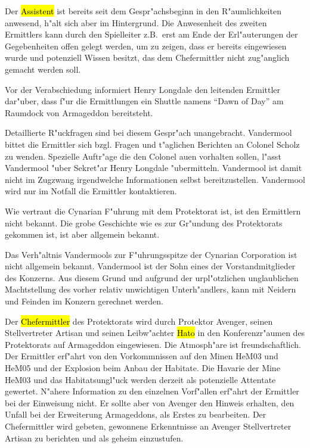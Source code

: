Der \hl{Assistent} ist bereits seit dem Gespr"achsbeginn in den R"aumlichkeiten anwesend, h"alt sich aber im Hintergrund. Die Anwesenheit des zweiten Ermittlers kann durch den Spielleiter z.B.~erst am Ende der Erl"auterungen der Gegebenheiten offen gelegt werden, um zu zeigen, dass er bereits eingewiesen wurde und potenziell Wissen besitzt, das dem Chefermittler nicht zug"anglich gemacht werden soll.

Vor der Verabschiedung informiert Henry Longdale den leitenden Ermittler dar"uber, dass f"ur die Ermittlungen ein Shuttle namens "`Dawn of Day"' am Raumdock von Armageddon bereitsteht.


\begin{remarks}	
	Detaillierte R"uckfragen sind bei diesem Gespr"ach unangebracht. Vandermool bittet die Ermittler sich bzgl. Fragen und t"aglichen Berichten an Colonel Scholz zu wenden. Spezielle Auftr"age die den Colonel au\3en vorhalten sollen, l"asst Vandermool "uber Sekret"ar Henry Longdale "ubermitteln. Vandermool ist damit nicht im Zugzwang irgendwelche Informationen selbst bereitzustellen. Vandermool wird nur im Notfall die Ermittler kontaktieren.

	Wie vertraut die Cynarian F"uhrung mit dem Protektorat ist, ist den Ermittlern nicht bekannt. Die grobe Geschichte wie es zur Gr"undung des Protektorats gekommen ist, ist aber allgemein bekannt.

	Das Verh"altnis Vandermools zur F"uhrungsspitze der Cynarian Corporation ist nicht allgemein bekannt. Vandermool ist der Sohn eines der Vorstandmitglieder des Konzerns. Aus diesem Grund und aufgrund der urpl"otzlichen unglaublichen Machtstellung des vorher relativ unwichtigen Unterh"andlers, kann mit Neidern und Feinden im Konzern gerechnet werden.
\end{remarks}



Der \hl{Chefermittler} des Protektorats wird durch Protektor Avenger, seinen Stellvertreter Artisan und seinen Leibw"achter \hl{Hato} in den Konferenzr"aumen des Protektorats auf Armageddon eingewiesen. Die Atmosph"are ist freundschaftlich. Der Ermittler erf"ahrt von den Vorkommnissen auf den Minen HeM03 und HeM05 und der Explosion beim Anbau der Habitate. Die Havarie der Mine HeM03 und das Habitatsungl"uck werden derzeit als potenzielle Attentate gewertet. N"ahere Information zu den einzelnen Vorf"allen erf"ahrt der Ermittler bei der Einweisung nicht. Er sollte aber von Avenger den Hinweis erhalten, den Unfall bei der Erweiterung Armageddons, als Erstes zu bearbeiten. Der Chefermittler wird gebeten, gewonnene Erkenntnisse an Avenger Stellvertreter Artisan zu berichten und als geheim einzustufen.

